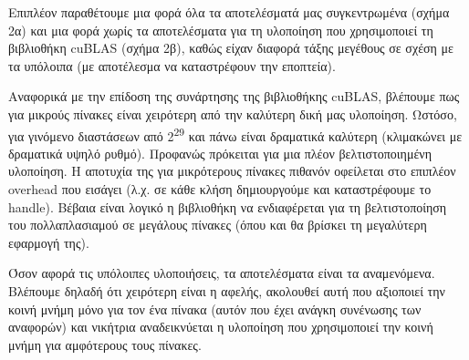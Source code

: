 \documentclass[titlepage]{article}
\begin{document}
Επιπλέον παραθέτουμε μια φορά όλα τα αποτελέσματά μας συγκεντρωμένα (σχήμα 2α) και μια φορά χωρίς τα αποτελέσματα για τη υλοποίηση που χρησιμοποιεί τη βιβλιοθήκη cuBLAS (σχήμα 2β), καθώς είχαν διαφορά τάξης μεγέθους σε σχέση με τα υπόλοιπα (με αποτέλεσμα να καταστρέφουν την εποπτεία).

Αναφορικά με την επίδοση της συνάρτησης της βιβλιοθήκης cuBLAS, βλέπουμε πως για μικρούς πίνακες είναι χειρότερη από την καλύτερη δική μας υλοποίηση. Ωστόσο, για γινόμενο διαστάσεων από 2\textsuperscript{29} και πάνω είναι δραματικά καλύτερη (κλιμακώνει με δραματικά υψηλό ρυθμό). Προφανώς πρόκειται για μια πλέον βελτιστοποιημένη υλοποίηση. Η αποτυχία της για μικρότερους πίνακες πιθανόν οφείλεται στο επιπλέον overhead που εισάγει (λ.χ. σε κάθε κλήση δημιουργούμε και καταστρέφουμε το handle). Βέβαια είναι λογικό η βιβλιοθήκη να ενδιαφέρεται για τη βελτιστοποίηση του πολλαπλασιαμού σε μεγάλους πίνακες (όπου και θα βρίσκει τη μεγαλύτερη εφαρμογή της).

Όσον αφορά τις υπόλοιπες υλοποιήσεις, τα αποτελέσματα είναι τα αναμενόμενα. Βλέπουμε δηλαδή ότι χειρότερη είναι η αφελής, ακολουθεί αυτή που αξιοποιεί την κοινή μνήμη μόνο για τον ένα πίνακα (αυτόν που έχει ανάγκη συνένωσης των αναφορών) και νικήτρια αναδεικνύεται η υλοποίηση που χρησιμοποιεί την κοινή μνήμη για αμφότερους τους πίνακες.
\end{document}
